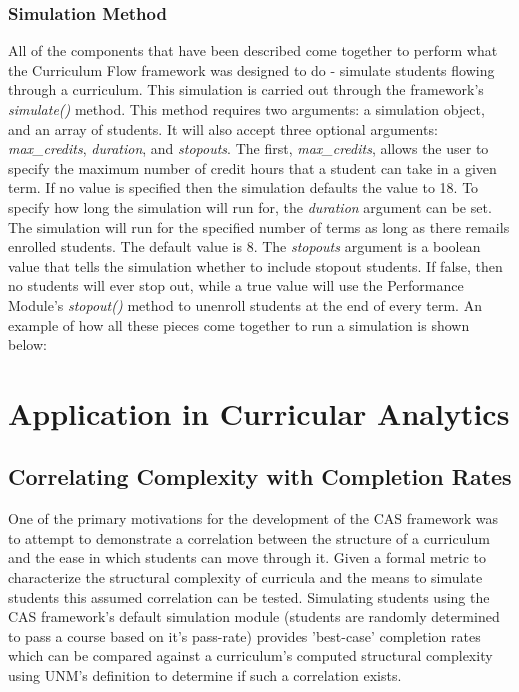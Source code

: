 \documentclass[botnum, fleqn]{unmeethesis}
\begin{document}
  
  \subsection{Simulation Method}
    All of the components that have been described come together to perform what the Curriculum Flow framework was designed to do - simulate students flowing through a curriculum. This simulation is carried out through the framework's \textit{simulate()} method. This method requires two arguments: a simulation object, and an array of students. It will also accept three optional arguments: \textit{max\_credits}, \textit{duration}, and \textit{stopouts}. The first, \textit{max\_credits}, allows the user to specify the maximum number of credit hours that a student can take in a given term. If no value is specified then the simulation defaults the value to 18. To specify how long the simulation will run for, the \textit{duration} argument can be set. The simulation will run for the specified number of terms as long as there remails enrolled students. The default value is 8. The \textit{stopouts} argument is a boolean value that tells the simulation whether to include stopout students. If false, then no students will ever stop out, while a true value will use the Performance Module's \textit{stopout()} method to unenroll students at the end of every term. An example of how all these pieces come together to run a simulation is shown below:

    


\chapter{Application in Curricular Analytics}

  \section{Correlating Complexity with Completion Rates}
    One of the primary motivations for the development of the CAS framework was to attempt to demonstrate a correlation between the structure of a curriculum and the ease in which students can move through it. Given a formal metric to characterize the structural complexity of curricula and the means to simulate students this assumed correlation can be tested. Simulating students using the CAS framework's default simulation module (students are randomly determined to pass a course based on it's pass-rate) provides 'best-case' completion rates which can be compared against a curriculum's computed structural complexity using UNM's definition to determine if such a correlation exists.
\end{document}

